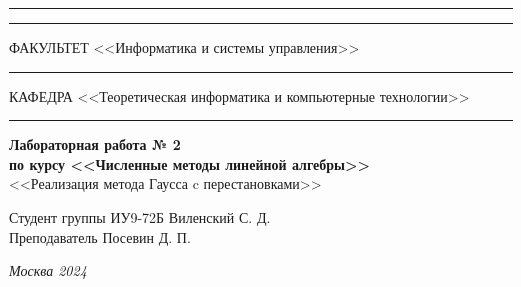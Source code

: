\documentclass[a4paper, 14pt]{extarticle}
\begin{document}
\begin{titlepage}
\vspace{-25pt}
\hspace{-35pt}\rule{\textwidth}{2.3pt}

\vspace*{-20.3pt}
\hspace{-35pt}\rule{\textwidth}{0.4pt}

\vspace{1.5ex}
\hspace{-35pt} \noindent \small ФАКУЛЬТЕТ\hspace{80pt} <<Информатика и системы управления>>

\vspace*{-16pt}
\hspace{47pt}\rule{0.83\textwidth}{0.4pt}

\vspace{0.5ex}
\hspace{-35pt} \noindent \small КАФЕДРА\hspace{50pt} <<Теоретическая информатика и компьютерные технологии>>

\vspace*{-16pt}
\hspace{30pt}\rule{0.866\textwidth}{0.4pt}
  
\vspace{11em}

\begin{center}
\Large {\bf Лабораторная работа № 2} \\ 
\large {\bf по курсу <<Численные методы линейной алгебры>>} \\
\large <<Реализация метода Гаусса c перестановками>> 
\end{center}\normalsize

\vspace{8em}


\begin{flushright}
  {Студент группы ИУ9-72Б Виленский С. Д. \hspace*{15pt}\\ 
  \vspace{2ex}
  Преподаватель Посевин Д. П.\hspace*{15pt}}
\end{flushright}

\bigskip

\vfill
 

\begin{center}
\textsl{Москва 2024}
\end{center}
\end{titlepage}
\end{document}

